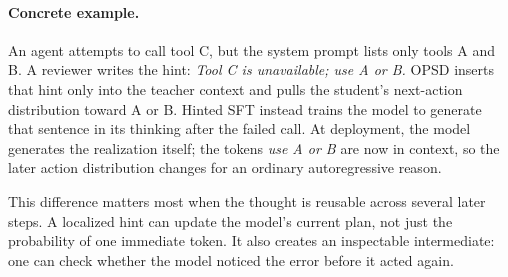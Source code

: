 \paragraph{Concrete example.}
An agent attempts to call tool C, but the system prompt lists only tools A and B. A
reviewer writes the hint: \emph{Tool C is unavailable; use A or B.} OPSD inserts that hint
only into the teacher context and pulls the student's next-action distribution toward A
or B. Hinted SFT instead trains the model to generate that sentence in its thinking after
the failed call. At deployment, the model generates the realization itself; the tokens
\emph{use A or B} are now in context, so the later action distribution changes for an
ordinary autoregressive reason.

This difference matters most when the thought is reusable across several later steps.
A localized hint can update the model's current plan, not just the probability of one
immediate token. It also creates an inspectable intermediate: one can check whether the
model noticed the error before it acted again.
